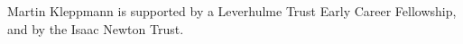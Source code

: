 \documentclass[manuscript]{acmart}
\begin{document}




\begin{acks}
Martin Kleppmann is supported by a Leverhulme Trust Early Career Fellowship, and by the Isaac Newton Trust.
\end{acks}



\end{document}
